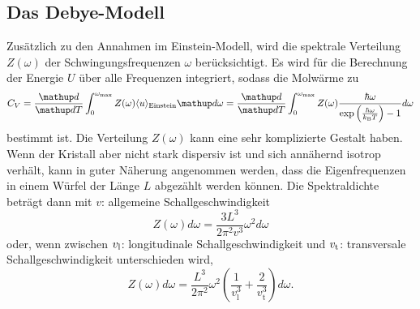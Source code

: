 \subsection{Das Debye-Modell}
Zusätzlich zu den Annahmen im Einstein-Modell, wird die spektrale Verteilung $Z(\omega)$ der Schwingungsfrequenzen $\omega$ berücksichtigt.
Es wird für die Berechnung der Energie $U$ über alle Frequenzen integriert, sodass die Molwärme zu
\begin{equation}
	C_V = \frac{\mathup d}{\mathup d T}\int_0^{\omega_\text{max}} Z(\omega) \langle u \rangle _\text{Einstein} \mathup d \omega= \frac{\mathup d}{\mathup d T}\int_0^{\omega_\text{max}} Z(\omega) \frac{\hbar\omega}{\exp{\left(\frac{\hbar\omega}{k_\text B T}\right)} - 1} d\omega
	\label{eqn:cvn}
\end{equation}
bestimmt ist.
Die Verteilung $Z(\omega)$ kann eine sehr komplizierte Gestalt haben. 
Wenn der Kristall aber nicht stark dispersiv ist und sich annähernd isotrop verhält, 
kann in guter Näherung angenommen werden, 
dass die Eigenfrequenzen in einem Würfel der Länge $L$ abgezählt werden können.
Die Spektraldichte beträgt dann mit $v$: allgemeine Schallgeschwindigkeit
\begin{equation*}
	Z(\omega)d\omega = \frac{3L^3}{2\pi^2v^3}\omega^2 d\omega
\end{equation*}
oder, wenn zwischen $v_\text l$: longitudinale Schallgeschwindigkeit und $v_\text t$: transversale Schallgeschwindigkeit unterschieden wird,
\begin{equation}
	Z(\omega)d\omega = \frac{L^3}{2\pi^2}\omega^2\left(\frac{1}{v_\text{l}^3}+\frac{2}{v_{\text{t}}^3}\right)d\omega.
	\label{eqn:z}
\end{equation}

